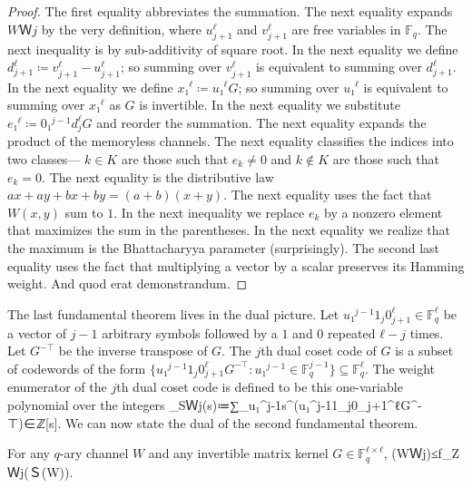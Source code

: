 \documentclass[openany]{amsbook}
\numberwithin{equation}{chapter}
\numberwithin{figure}{chapter}
\numberwithin{table}{chapter}
\def\Git{G^{-⊤}}
\DeclareMathOperator\hwt{hwt}
\def\[#1\]{\begin{equation*}{#1}\end{equation*}}
\theoremstyle{definition}	理dfn:Definition~?s			理exa:Example~?s
\theoremstyle{remark}		理cla:Claim~?s				理rem:Remark~?s
\begin{document}
\begin{proof}
		The first equality abbreviates the summation.
		The next equality expands $WＷj$ by the very definition,
		where $u_{j+1}^ℓ$ and $v_{j+1}^ℓ$ are free variables in $𝔽_q$.
		The next inequality is by sub-additivity of square root.
		In the next equality we define $d_{j+1}^ℓ≔v_{j+1}^ℓ-u_{j+1}^ℓ$;
		so summing over $v_{j+1}^ℓ$ is equivalent to summing over $d_{j+1}^ℓ$.
		In the next equality we define $x₁^ℓ≔u₁^ℓG$;
		so summing over $u₁^ℓ$ is equivalent to summing over $x₁^ℓ$
		as $G$ is invertible.
		In the next equality we substitute $e₁^ℓ≔0₁^{j-1}d_j^ℓG$
		and reorder the summation.
		The next equality expands the product of the memoryless channels.
		The next equality classifies the indices into two classes---%
		$k∈K$ are those such that $e_k≠0$ and $k∉K$ are those such that $e_k=0$.
		The next equality is the distributive law $ax+ay+bx+by=(a+b)(x+y)$.
		The next equality uses the fact that $W(x,y)$ sum to $1$.
		In the next inequality we replace $e_k$ by a nonzero element
		that maximizes the sum in the parentheses.
		In the next equality we realize that
		the maximum is the Bhattacharyya parameter (surprisingly).
		The second last equality uses the fact that
		multiplying a vector by a scalar preserves its Hamming weight.
		And quod erat demonstrandum.
	\end{proof}
	
	The last fundamental theorem lives in the dual picture.
	Let $u₁^{j-1}1_j0_{j+1}^ℓ∈𝔽_q^ℓ$ be a vector of
	$j-1$ arbitrary symbols followed by a $1$ and $0$ repeated $ℓ-j$ times.
	Let $\Git$ be the inverse transpose of $G$.
	The $j$th dual coset code of $G$ is a subset of codewords of the form
	$\{u₁^{j-1}1_j0_{j+1}^ℓ\Git:u₁^{j-1}∈𝔽_q^{j-1}\}⊆𝔽_q^ℓ$.
	The weight enumerator of the $j$th dual coset code is
	defined to be this one-variable polynomial over the integers
	\[f_SＷj(s)≔∑_{u₁^{j-1}}s^{\hwt(u₁^{j-1}1_j0_{j+1}^ℓ\Git)}∈ℤ[s].\]
	We can now state the dual of the second fundamental theorem.
	
	\begin{thm}
		\label{thm:ftpcS}
		For any $q$-ary channel $W$ and any invertible matrix kernel $G∈𝔽_q^{ℓ×ℓ}$,
		\[Ｓ(WＷj)≤f_ZＷj(Ｓ(W)).\]
	\end{thm}
	
\end{document}
